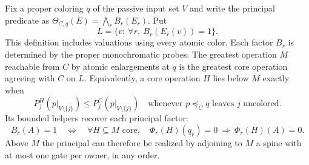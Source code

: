 \begin{theorem}
\label{core:thm:principal-box-extension}
Fix a proper coloring $q$ of the passive input set $V$ and write
the principal predicate as
$\Theta_{C,q}(E)=\bigwedge_r B_r(E_r)$. Put
\[
 L=\{v:\ \forall r,\ B_r(E_r(v))=1\}.
\]
This definition includes valuations using every atomic color. Each
factor $B_r$ is determined by the proper monochromatic probes.
The greatest operation $M$ reachable from $C$ by atomic enlargements
at $q$ is the greatest core operation agreeing with $C$ on $L$.
Equivalently, a core operation $H$ lies below $M$ exactly when
\[
 P_j^H(p|_{V\setminus\{j\}})\leq P_j^C(p|_{V\setminus\{j\}})
 \quad\text{whenever }p\preceq_C q\text{ leaves }j\text{ uncolored}.
\]
Its bounded helpers recover each principal factor:
\[
 B_r(A)=1\quad\Longleftrightarrow\quad
 \forall H\subseteq M\text{ core},\quad
 \Phi_r(H)(q_r)=0\ \Longrightarrow\ \Phi_r(H)(A)=0 .
\]
Above $M$ the principal can therefore be realized by adjoining to $M$
a spine with at most one gate per owner, in any order.
\end{theorem}
